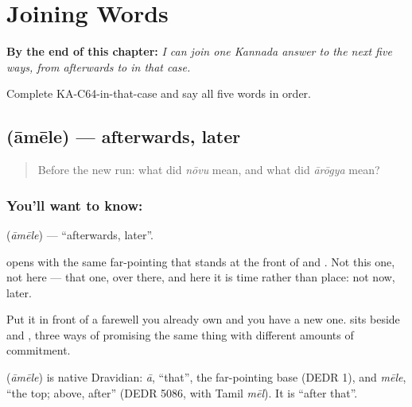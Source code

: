 
\chapter{Joining Words}
\label{ch:ka-joining}

\begin{chapteropening}
\textbf{By the end of this chapter:} \emph{I can join one Kannada answer to the next five ways, from afterwards to in that case.}

Complete KA-C64-in-that-case and say all five words in order.
\end{chapteropening}

\section[\texorpdfstring{\kn{ಆಮೇಲೆ} (āmēle)}{ಆಮೇಲೆ (āmēle)}]{ (āmēle) — afterwards, later}

\label{lesson:KA-C64-after}



\begin{quote}
Before the new run: what did \emph{nōvu} mean, and what did \emph{ārōgya} mean?
\end{quote}

\subsection*{You'll want to know: }
\textbf{} (\emph{āmēle}) — \textquotedblleft{}afterwards, later\textquotedblright{}.

 opens with the same far-pointing  that stands at the front of  and . Not this one, not here — that one, over there, and here it is time rather than place: not now, later.

Put it in front of a farewell you already own and you have a new one.   sits beside   and  , three ways of promising the same thing with different amounts of commitment.

\begin{cousinweb}
\textbf{} (\emph{āmēle}) is native Dravidian: \emph{ā}, \textquotedblleft{}that\textquotedblright{}, the far-pointing base (DEDR 1), and \emph{mēle}, \textquotedblleft{}the top; above, after\textquotedblright{} (DEDR 5086, with Tamil \emph{mēl}). It is \textquotedblleft{}after that\textquotedblright{}.
\end{cousinweb}


